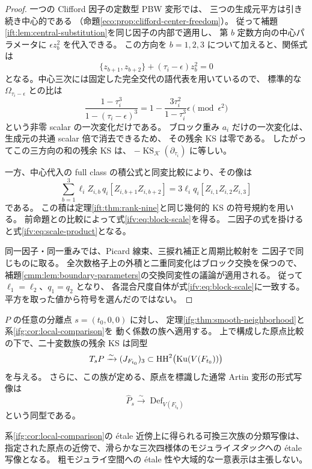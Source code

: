 \begin{proof}
一つの Clifford 因子の定数型 PBW 変形では、
三つの生成元平方は引き続き中心的である
（命題\ref{eco:prop:clifford-center-freedom}）。
従って補題\ref{ift:lem:central-substitution}を同じ因子の内部で適用し、
第 $b$ 定数方向の中心パラメータに $\epsilon z_b^2$ を代入できる。
この方向を $b=1,2,3$ について加えると、関係式は
\[
       \{z_{b+1},z_{b+2}\}+(\tau_i-\epsilon)z_b^2=0
\]
となる。中心三次には固定した完全交代の語代表を用いているので、
標準的な $\Omega_{\tau_i-\epsilon}$ との比は
\[
 \frac{1-\tau_i^3}{1-(\tau_i-\epsilon)^3}
   =1-\frac{3\tau_i^2}{1-\tau_i^3}\epsilon
       \pmod{\epsilon^2}
\]
という非零 scalar の一次変化だけである。
ブロック重み $a_i$ だけの一次変化は、生成元の共通 scalar 倍で消去できるため、
その残余 KS は零である。
したがってこの三方向の和の残余 KS は、
$-\operatorname{KS}_{\mathcal K}(\partial_{\tau_i})$ に等しい。

一方、中心代入の full class の積公式と同変比較により、その像は
\[
  \sum_{b=1}^3\ell_iZ_{i,b}\,q_i[Z_{i,b+1}Z_{i,b+2}]
      =3\ell_iq_i[Z_{i,1}Z_{i,2}Z_{i,3}]
\]
である。
この積は定理\ref{ift:thm:rank-nine}と同じ幾何的 KS の符号規約を用いる。
前命題との比較によって式\eqref{ifv:eq:block-scale}を得る。
二因子の式を掛けると式\eqref{ifv:eq:scale-product}となる。

同一因子・同一重みでは、Picard 線束、三捩れ補正と周期比較射を
二因子で同じものに取る。
全次数格子上の外積と二重同変化はブロック交換を保つので、
補題\ref{cmm:lem:boundary-parameters}の交換同変性の議論が適用される。
従って $\ell_1=\ell_2$、$q_1=q_2$ となり、
各混合尺度自体が式\eqref{ifv:eq:block-scale}に一致する。
平方を取った値から符号を選んだのではない。
\end{proof}

\begin{theorem}[分離原点における二十方向の幾何的完全性]
\label{ifv:thm:versal}
$P$ の任意の分離点 $s=(t_0,0,0)$ に対し、
定理\ref{ifg:thm:smooth-neighborhood}と系\ref{ifg:cor:local-comparison}を
動く係数の族へ適用する。
上で構成した原点比較の下で、二十変数族の残余 KS は同型
\begin{equation}\label{ifv:eq:twenty-ks}
       T_sP\xrightarrow{\sim}(J_{F_{t_0}})_3
                  \subset\mathrm{HH}^2\bigl(\operatorname{Ku}(V(F_{t_0}))\bigr)
\end{equation}
を与える。
さらに、この族が定める、原点を標識した通常 Artin 変形の形式写像は
\begin{equation}\label{ifv:eq:formal-isomorphism}
       \widehat P_s\xrightarrow{\sim}\operatorname{Def}_{V(F_{t_0})}
\end{equation}
という同型である。

系\ref{ifg:cor:local-comparison}の \'etale 近傍上に得られる可換三次族の分類写像は、
指定された原点の近傍で、滑らかな三次四様体のモジュライ\emph{スタック}への
\'etale 写像となる。
粗モジュライ空間への \'etale 性や大域的な一意表示は主張しない。
\end{theorem}

